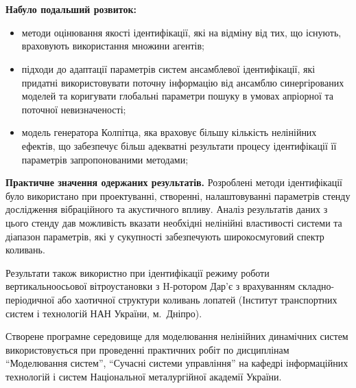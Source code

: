 \documentclass[14pt,handout,utf8]{beamer}
\begin{document}

\begin{frame}
  \frametitle{~}

  \noindent
  \textbf{Набуло подальший розвиток:}
  \begin{itemize}

    \item \justifying
      методи оцінювання якості ідентифікації,
      які на відміну від тих, що існують,
      враховують використання множини агентів;

    \item \justifying
      підходи до адаптації параметрів систем
      ансамблевої ідентифікації, які придатні використовувати поточну
      інформацію від ансамблю синергірованих моделей та коригувати глобальні
      параметри пошуку в умовах апріорної та поточної невизначеності;

    \item \justifying
      модель генератора Колпітца, яка враховує
      більшу кількість нелінійних ефектів,
      що забезпечує більш адекватні результати процесу
      ідентифікації її параметрів запропонованими методами;
  \end{itemize}


\textbf{Практичне значення одержаних результатів.}
Розроблені методи ідентифікації було використано
при проектуванні, створенні, налаштовуванні параметрів
стенду дослідження вібраційного та акустичного впливу.
Аналіз результатів даних з цього стенду
дав можливість вказати необхідні нелінійні властивості системи
та діапазон параметрів, які у сукупності
забезпечують широкосмуговий спектр коливань.

Результати також використно
при ідентифікації режиму роботи вертикально\-осьової вітроустановки з H-ротором Дар'є
з врахуванням складно-періодичної або хаотичної структури коливань лопатей
(Інститут транспортних систем і технологій НАН України, м.~Дніпро).

Створене програмне середовище для моделювання нелінійних динамічних систем
використовується при проведенні практичних робіт по дисциплінам
``Моделювання систем'',
``Сучасні системи управління'' на кафедрі інформаційних технологій
і систем Національної металургійної академії України.

\end{frame}


\end{document}
